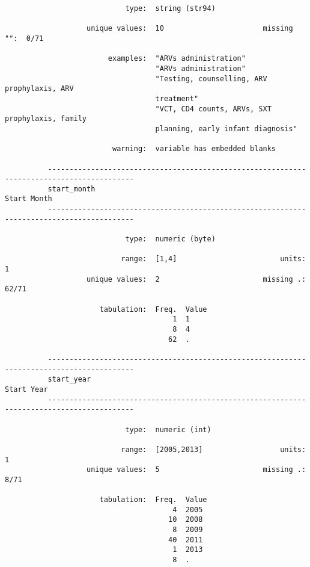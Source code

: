 \documentclass{article}
\begin{document}
\begin{verbatim}
                            type:  string (str94)
          
                   unique values:  10                       missing "":  0/71
          
                        examples:  "ARVs administration"
                                   "ARVs administration"
                                   "Testing, counselling, ARV prophylaxis, ARV
                                   treatment"
                                   "VCT, CD4 counts, ARVs, SXT prophylaxis, family
                                   planning, early infant diagnosis"
          
                         warning:  variable has embedded blanks
          
          ------------------------------------------------------------------------------------------
          start_month                                                                    Start Month
          ------------------------------------------------------------------------------------------
          
                            type:  numeric (byte)
          
                           range:  [1,4]                        units:  1
                   unique values:  2                        missing .:  62/71
          
                      tabulation:  Freq.  Value
                                       1  1
                                       8  4
                                      62  .
          
          ------------------------------------------------------------------------------------------
          start_year                                                                      Start Year
          ------------------------------------------------------------------------------------------
          
                            type:  numeric (int)
          
                           range:  [2005,2013]                  units:  1
                   unique values:  5                        missing .:  8/71
          
                      tabulation:  Freq.  Value
                                       4  2005
                                      10  2008
                                       8  2009
                                      40  2011
                                       1  2013
                                       8  .
          

\end{verbatim}
\end{document}
